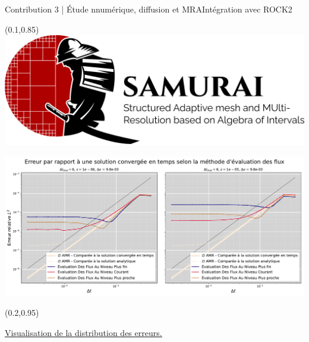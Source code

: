 \begin{frame}{Contribution 3 | Étude nnumérique, diffusion et MRA}{Intégration avec ROCK2}
    \begin{textblock*}{40pt}(0.1\paperwidth,0.85\paperheight)
        \includegraphics[scale=.03]{medias/2_/1_/light_logo.png}
    \end{textblock*}
    \centering
    \includegraphics[width= \textwidth]{medias/2_/3_/flux_reconstruction_method_diffusion.pdf}
    
    \begin{textblock*}{40pt}(0.2\paperwidth,0.95\paperheight)
        {\color{black}{+ Ponio}}
    \end{textblock*}
    \href{https://github.com/Ocelot-Pale/etude_MR_RK2}{\color{Primary} \underline{Visualisation de la distribution des erreurs.}}\color{black}
\end{frame}

